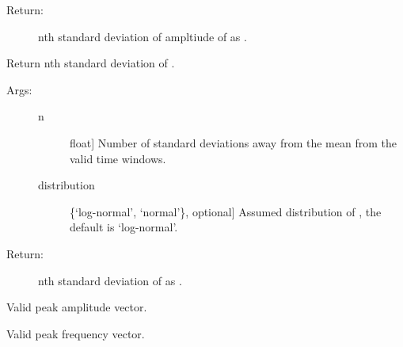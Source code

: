 \documentclass[letterpaper,10pt,english,openany,oneside]{sphinxmanual}
\begin{document}
\begin{fulllineitems}
\begin{fulllineitems}
\begin{description}
\item[{Return:}] \leavevmode
nth standard deviation of ampltiude of  as .

\end{description}

\end{fulllineitems}


\begin{fulllineitems}
\label{\detokenize{index:hvsrpy.Hvsr.nstd_f0_frq}}
Return nth standard deviation of .
\begin{description}
\item[{Args:}] \leavevmode\begin{description}
\item[{n}] \leavevmode{[}float{]}
Number of standard deviations away from the mean 
from the valid time windows.

\item[{distribution}] \leavevmode{[}\{‘log-normal’, ‘normal’\}, optional{]}
Assumed distribution of , the default is
‘log-normal’.

\end{description}

\item[{Return:}] \leavevmode
nth standard deviation of  as .

\end{description}

\end{fulllineitems}


\begin{fulllineitems}
\label{\detokenize{index:hvsrpy.Hvsr.peak_amp}}
Valid peak amplitude vector.

\end{fulllineitems}


\begin{fulllineitems}
\label{\detokenize{index:hvsrpy.Hvsr.peak_frq}}
Valid peak frequency vector.


\end{fulllineitems}
\end{fulllineitems}
\end{document}
